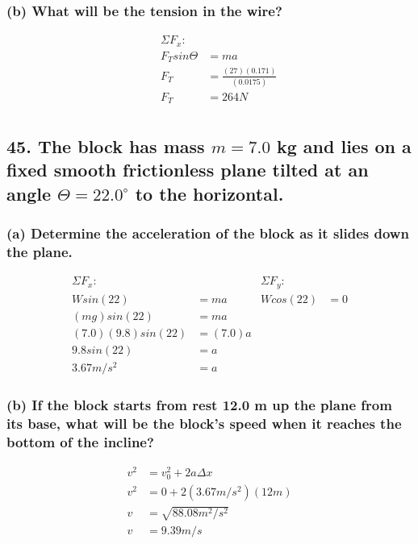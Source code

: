\documentclass[12pt,a4paper,english]{article}
\begin{document}
\begin{flushleft}
  \subsubsection{(b) What will be the tension in the wire?}
  \begin{align*}
    &&\Sigma F_x:&
    \\
    &&F_Tsin\Theta&=ma
    \\
    &&F_T&=\frac{(27)(0.171)}{(0.0175)}
    \\
    &&F_T&=264N
    \\
  \end{align*}
  \subsection{45. The block has mass $m=7.0$ kg and lies on a fixed smooth frictionless plane tilted at an angle $\Theta=22.0^\circ$ to the horizontal.}
  \subsubsection{(a) Determine the acceleration of the block as it slides down the plane.}
  \begin{align*}
    \Sigma F_x:&
      &\Sigma F_y:&
      \\
    Wsin(22)&=ma
      &Wcos(22)&=0
      \\
    (mg)sin(22)&=ma
    \\
    (7.0)(9.8)sin(22)&=(7.0)a
    \\
    9.8sin(22)&=a
    \\
    3.67m/s^2&=a
  \end{align*}
  \subsubsection{(b) If the block starts from rest 12.0 m up the plane from its base, what will be the block's speed when it reaches the bottom of the incline?}
  \begin{align*}
    v^2&=v_0^2+2a\Delta x
    \\
    v^2&=0+2(3.67m/s^2)(12m)
    \\
    v&=\sqrt{88.08m^2/s^2}
    \\
    v&=9.39m/s
  \end{align*}
\end{flushleft}
\end{document}
